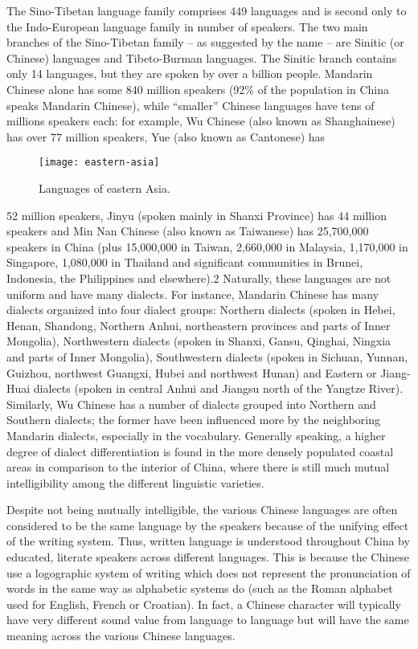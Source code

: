 The Sino-Tibetan language family comprises 449 languages and is
second only to the Indo-European language family in number of speakers. The
two main branches of the Sino-Tibetan family – as suggested by the name –
are Sinitic (or Chinese) languages and Tibeto-Burman languages. The Sinitic
branch contains only 14 languages, but they are spoken by over a billion people.
Mandarin Chinese alone has some 840 million speakers (92\% of the population
in China speaks Mandarin Chinese), while ``smaller'' Chinese languages
have tens of millions speakers each: for example, Wu Chinese (also known as
Shanghainese) has over 77 million speakers, Yue (also known as Cantonese) has
\begin{figure}[htbp]
\centering

\texttt{[image: eastern-asia]}

\caption{Languages of eastern Asia.}
\end{figure}
52 million speakers, Jinyu (spoken mainly in Shanxi Province) has 44 million
speakers and Min Nan Chinese (also known as Taiwanese) has 25,700,000 speakers
in China (plus 15,000,000 in Taiwan, 2,660,000 in Malaysia, 1,170,000 in Singapore,
1,080,000 in Thailand and significant communities in Brunei, Indonesia,
the Philippines and elsewhere).2 Naturally, these languages are not uniform and
have many dialects. For instance, Mandarin Chinese has many dialects organized
into four dialect groups: Northern dialects (spoken in Hebei, Henan, Shandong,
Northern Anhui, northeastern provinces and parts of Inner Mongolia), Northwestern
dialects (spoken in Shanxi, Gansu, Qinghai, Ningxia and parts of Inner
Mongolia), Southwestern dialects (spoken in Sichuan, Yunnan, Guizhou, northwest
Guangxi, Hubei and northwest Hunan) and Eastern or Jiang-Huai dialects
(spoken in central Anhui and Jiangsu north of the Yangtze River). Similarly, Wu
Chinese has a number of dialects grouped into Northern and Southern dialects;
the former have been influenced more by the neighboring Mandarin dialects,
especially in the vocabulary. Generally speaking, a higher degree of dialect differentiation
is found in the more densely populated coastal areas in comparison to the interior of China, where there is still much mutual intelligibility among the
different linguistic varieties.

Despite not being mutually intelligible, the various Chinese languages are often
considered to be the same language by the speakers because of the unifying effect
of the writing system. Thus, written language is understood throughout China by
educated, literate speakers across different languages. This is because the Chinese
use a logographic system of writing which does not represent the pronunciation
of words in the same way as alphabetic systems do (such as the Roman alphabet
used for English, French or Croatian). In fact, a Chinese character will typically
have very different sound value from language to language but will have the same
meaning across the various Chinese languages.

